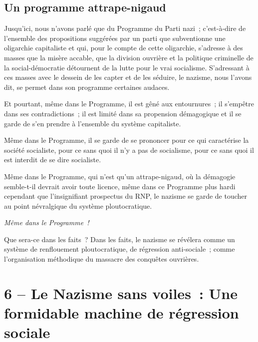 \documentclass[french,twoside]{book} %
\newcommand\chapteropen{} %
\newcommand\chapterclose{} %
\begin{document}
\section[{Un programme attrape-nigaud}]{Un programme attrape-nigaud}
\noindent Jusqu’ici, nous n’avons parlé que du Programme du Parti nazi ; c’est-à-dire de l’ensemble des propositions suggérées par un parti que subventionne une oligarchie capitaliste et qui, pour le compte de cette oligarchie, s’adresse à des masses que la misère accable, que la division ouvrière et la politique criminelle de la social-démocratie détournent de la lutte pour le vrai socialisme. S’adressant à ces masses avec le dessein de les capter et de les séduire, le nazisme, nous l’avons dit, se permet dans son programme certaines audaces.\par
Et pourtant, même dans le Programme, il est gêné aux entournures ; il s’empêtre dans ses contradictions ; il est limité dans sa propension démagogique et il se garde de s’en prendre à l’ensemble du système capitaliste.\par
Même dans le Programme, il se garde de se prononcer pour ce qui caractérise la société socialiste, pour ce sans quoi il n’y a pas de socialisme, pour ce sans quoi il est interdit de se dire socialiste.\par
Même dans le Programme, qui n’est qu’un attrape-nigaud, où la démagogie semble-t-il devrait avoir toute licence, même dans ce Programme plus hardi cependant que l’insignifiant prospectus du RNP, le nazisme se garde de toucher au point névralgique du système ploutocratique.\par
{\itshape Même dans le Programme !}\par
Que sera-ce dans les faits ? Dans les faits, le nazisme se révélera comme un système de renflouement ploutocratique, de régression anti-sociale ; comme l’organisation méthodique du massacre des conquêtes ouvrières.
\chapterclose


\chapteropen
\chapter[{6 – Le Nazisme sans voiles : Une formidable machine de régression sociale}]{6 – Le Nazisme sans voiles : Une formidable machine de régression sociale}\renewcommand{\leftmark}{6 – Le Nazisme sans voiles : Une formidable machine de régression sociale}
\end{document}
